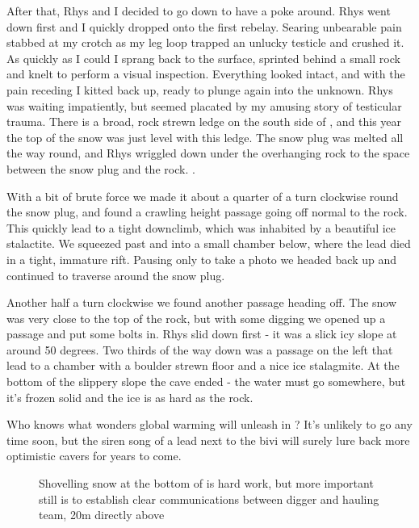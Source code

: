 After that, Rhys and I decided to go down to have a poke around. Rhys went down first and I quickly dropped onto the first rebelay. Searing unbearable pain stabbed at my crotch as my leg loop trapped an unlucky testicle and crushed it. As quickly as I could I sprang back to the surface, sprinted behind a small rock and knelt to perform a visual inspection. Everything looked intact, and with the pain receding I kitted back up, ready to plunge again into the unknown.
Rhys was waiting impatiently, but seemed placated by my amusing story of testicular trauma. There is a broad, rock strewn ledge on the south side of , and this year the top of the snow was just level with this ledge. The snow plug was melted all the way round, and Rhys wriggled down under the overhanging rock to the space between the snow plug and the rock. .

With a bit of brute force we made it about a quarter of a turn clockwise round the snow plug, and found a crawling height passage going off normal to the rock. This quickly lead to a tight downclimb, which was inhabited by a beautiful ice stalactite. We squeezed past and into a small chamber below, where the lead died in a tight, immature rift. Pausing only to take a photo we headed back up and continued to traverse around the snow plug.



Another half a turn clockwise we found another passage heading off. The snow was very close to the top of the rock, but with some digging we opened up a passage and put some bolts in. Rhys slid down first - it was a slick icy slope at around 50 degrees. Two thirds of the way down was a passage on the left that lead to a chamber with a boulder strewn floor and a nice ice stalagmite. At the bottom of the slippery slope the cave ended - the water must go somewhere, but it's frozen solid and the ice is as hard as the rock.



Who knows what wonders global warming will unleash in ? It's unlikely to go any time soon, but the siren song of a lead next to the bivi will surely lure back more optimistic cavers for years to come.

\begin{figure}[b!]
\checkoddpage \ifoddpage \forcerectofloat \else \forceversofloat \fi
\centering
{}
\caption{Shovelling snow at the bottom of \protect{} is hard work, but more important still is to establish clear communications between digger and hauling team, 20m directly above }
\label{bottom of M10}
\end{figure}

